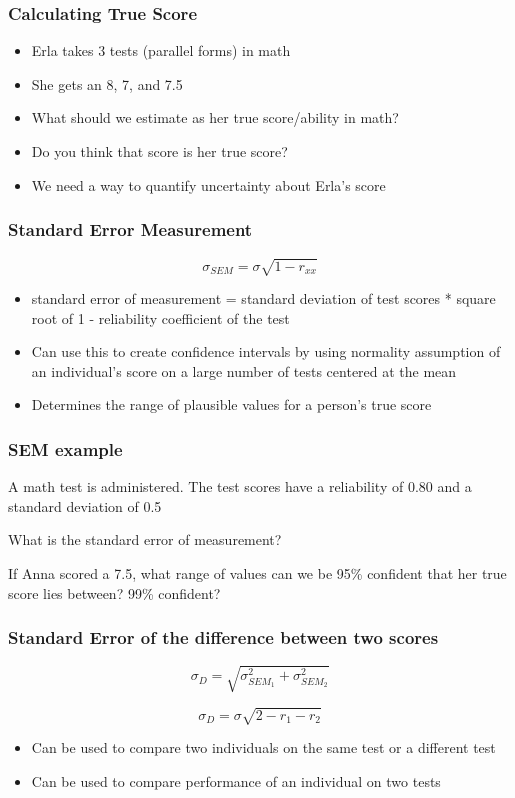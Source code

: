 \documentclass[dvipsnames]{beamer}\usepackage[]{graphicx}\usepackage[]{color}
\begin{document}
\begin{frame}
\frametitle{Calculating True Score}
\begin{itemize}
  \item Erla takes 3 tests (parallel forms) in math
  \item She gets an 8, 7, and 7.5
  \item What should we estimate as her true score/ability in math?
  \item Do you think that score is her true score?
  \item<2-> \textcolor{wared}{We need a way to quantify uncertainty about Erla's score}
\end{itemize}
\end{frame}

\begin{frame}
\frametitle{Standard Error Measurement}
$$\sigma_{SEM} = \sigma\sqrt{1 - r_{xx}}$$
\begin{itemize}
\item standard error of measurement = standard deviation of test scores * square root of 1 - reliability coefficient of the test
  \item<2->Can use this to create confidence intervals by using normality assumption of an individual's score on a large number of tests centered at the mean
  \item<2-> Determines the range of plausible values for a person's true score
\end{itemize}
\end{frame}

\begin{frame}
\frametitle{SEM example}

A math test is administered. The test scores have a reliability of 0.80 and a standard deviation of 0.5

\vspace{1cm}
What is the standard error of measurement?

\vspace{1cm}
If Anna scored a 7.5, what range of values can we be 95\% confident that her true score lies between? 99\% confident?
\end{frame}

\begin{frame}
\frametitle{Standard Error of the difference between two scores}
$$\sigma_D = \sqrt{\sigma_{SEM_1}^2 + \sigma_{SEM_2}^2} $$

$$\sigma_D = \sigma\sqrt{2 - r_1 - r_2} $$

\begin{itemize}
  \item Can be used to compare two individuals on the same test or a different test
  \item Can be used to compare performance of an individual on two tests
\end{itemize}
\end{frame}
\end{document}
